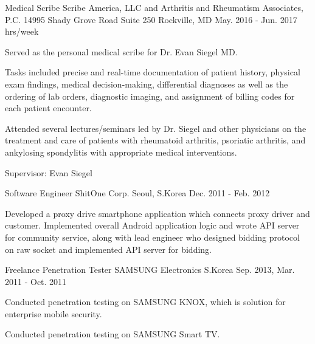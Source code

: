 \begin{cventries}
  \cventry
    {Medical Scribe} %
    {Scribe America, LLC and Arthritis and Rheumatism Associates, P.C.} %
    {14995 Shady Grove Road \newline Suite 250 \newline Rockville, MD} %
    {May. 2016 - Jun. 2017  hrs/week} %
    {
      \begin{cvitems} %
        \item {Served as the personal medical scribe for Dr. Evan Siegel MD.}
        \item{Tasks included precise and real-time documentation of patient history, physical exam findings, medical decision-making, differential diagnoses as well as the ordering of lab orders, diagnostic imaging, and assignment of billing codes for each patient encounter.}
        \item{Attended several lectures/seminars led by Dr. Siegel and other physicians on the treatment and care of patients with rheumatoid arthritis, psoriatic arthritis, and ankylosing spondylitis with appropriate medical interventions.}
        \item{Supervisor: Evan Siegel}
      \end{cvitems}
    }

  \cventry
    {Software Engineer} %
    {ShitOne Corp.} %
    {Seoul, S.Korea} %
    {Dec. 2011 - Feb. 2012} %
    {
      \begin{cvitems} %
        \item {Developed a proxy drive smartphone application which connects proxy driver and customer. Implemented overall Android application logic and wrote API server for community service, along with lead engineer who designed bidding protocol on raw socket and implemented API server for bidding.}
      \end{cvitems}
    }

  \cventry
    {Freelance Penetration Tester} %
    {SAMSUNG Electronics} %
    {S.Korea} %
    {Sep. 2013, Mar. 2011 - Oct. 2011} %
    {
      \begin{cvitems} %
        \item {Conducted penetration testing on SAMSUNG KNOX, which is solution for enterprise mobile security.}
        \item {Conducted penetration testing on SAMSUNG Smart TV.}
      \end{cvitems}
    }

\end{cventries}
